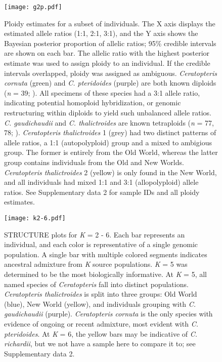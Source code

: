 \documentclass[12pt]{article}
\begin{document}
\begin{figure}[H]
\centering
\texttt{[image: g2p.pdf]}
\caption{Ploidy estimates for a subset of individuals. The X axis displays the estimated allele ratios (1:1, 2:1, 3:1), and the Y axis shows the Bayesian posterior proportion of allelic ratios; 95\% credible intervals are shown on each bar. The allelic ratio with the highest posterior estimate was used to assign ploidy to an individual. If the credible intervals overlapped, ploidy was assigned as ambiguous. \textit{Ceratopteris cornuta} (green) and \textit{C. pteridoides} (purple) are both known diploids (\textit{n} = 39; \cite{Hickok1977}). All specimens of these species had a 3:1 allele ratio, indicating potential homoploid hybridization, or genomic restructuring within diploids to yield such unbalanced allele ratios. \textit{C. gaudichaudii} and \textit{C. thalictroides} are known tetraploids (\textit{n} = 77, 78; \cite{Masuyama2010}). \textit{Ceratopteris thalictroides} 1 (grey) had two distinct patterns of allele ratios, a 1:1 (autopolyploid) group and a mixed to ambigious group. The former is entirely from the Old World, whereas the latter group contains individuals from the Old and New Worlds. \textit{Ceratopteris thalictroides} 2 (yellow) is only found in the New World, and all individuals had mixed 1:1 and 3:1 (allopolyploid) allele ratios. See Supplementary data 2 for sample IDs and all ploidy estimates.}
\label{g2p}
\end{figure}

\begin{figure}[H]
\centering
\texttt{[image: k2-6.pdf]}
\caption{{\small{STRUCTURE}} plots for \textit{K} = 2 - 6. Each bar represents an individual, and each color is representative of a single genomic population. A single bar with multiple colored segments indicates ancestral admixture from \textit{K} source populations. \textit{K} = 5 was determined to be the most biologically informative. At \textit{K} = 5, all named species of \textit{Ceratopteris} fall into distinct populations. \textit{Ceratopteris thalictroides} is split into three groups: Old World (blue), New World (yellow), and individuals grouping with \textit{C. gaudichaudii} (purple). \textit{Ceratopteris cornuta} is the only species with evidence of ongoing or recent admixture, most evident with \textit{C. pteridoides}. At \textit{K} = 6, the yellow bars may be indicative of \textit{C. richardii}, but we not have a sample here to compare it to; see Supplementary data 2.}
\label{structure}
\end{figure}
\end{document}
